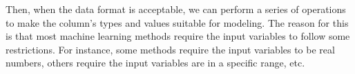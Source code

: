 Then, when the data format is acceptable, we can perform a series of operations to make the
column's types and values suitable for modeling.  The reason for this is that most
machine learning methods require the input variables to follow some restrictions.  For
instance, some methods require the input variables to be real numbers, others require the
input variables are in a specific range, etc.

%
%
%
%


